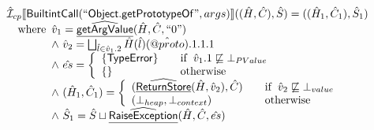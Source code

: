 \documentclass{article}
\newcommand{\SF}[1]{\mbox{\textsf{#1}}}
\newcommand{\wherec}[1]{{\rm where}\begin{array}[t]{l}#1\end{array}}
\newcommand{\ifc}[1]{{\rm if}\begin{array}[t]{l}#1\end{array}}
\newcommand{\owc}{{\rm otherwise}}
\newcommand{\aI}{\hat{\mathcal{I}}}
\newcommand{\lbr}{\llbracket}
\newcommand{\rbr}{\rrbracket}
\newcommand{\ahf}[1]{\widehat{\underline{\sf #1}}}
\begin{document}
\[
\begin{array}{l}
\aI _{cp}\lbr \SF{BuiltintCall}(``\SF{Object.getPrototypeOf}",args)\rbr((\hat{H},\hat{C}), \hat{S})
  = ((\hat{H}_1, \hat{C}_1), \hat{S}_1)\\
\quad\wherec{
  \hat{v}_1 =\ahf{getArgValue}(\hat{H}, \hat{C}, ``0")\\
  \land\ \hat{v}_2 = \bigsqcup_{\hat{l} \in \hat{v}_1.2} \hat{H}(\hat{l})(\hat{@proto}).1.1.1\\
  \land\ \hat{es} =
    \left\{
    \begin{array}{l@{\quad\quad}l}
      \{ \SF{TypeError} \} & \ifc{\hat{v}_1.1 \not\sqsubseteq \bot_{PValue}}\\
      \{ \}& \owc\\
    \end{array}
    \right.\\
  \land\ (\hat{H}_1, \hat{C}_1) = 
    \left\{\begin{array}{l@{\quad\quad}l}
      (\ahf{ReturnStore}(\hat{H},\hat{v}_2), \hat{C})
      & \ifc{\hat{v}_2 \not\sqsubseteq \bot_{value}}\\
      (\bot_{heap}, \bot_{context}) & \owc \\
    \end{array}\right.\\
  \land\ \hat{S}_1 = \hat{S} \sqcup \ahf{RaiseException}(\hat{H}, \hat{C}, \hat{es})\\
  }\\
\\\\  




\end{array}\]
\end{document}
